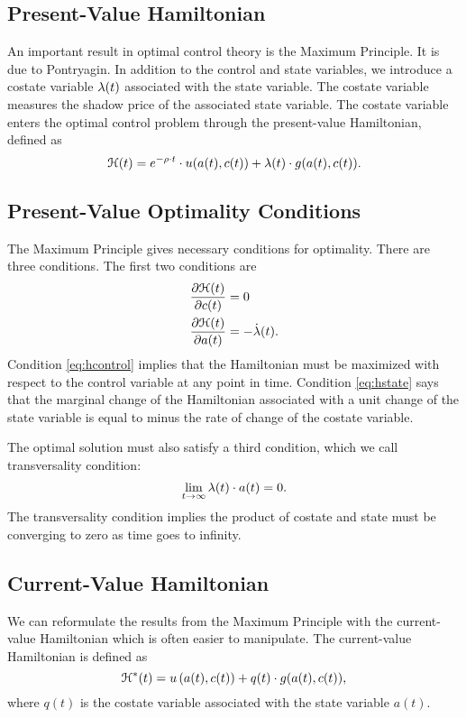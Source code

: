\documentclass[letterpaper,12pt,leqno]{article}
\begin{document}
\subsection{Present-Value Hamiltonian}

An important result in optimal control theory is the Maximum Principle. It is due to Pontryagin. In addition to the control and state variables, we introduce a costate variable $\lambda (t)$  associated with the state variable. The costate variable measures the shadow price of the associated state variable. The costate variable enters the optimal control problem through the present-value Hamiltonian, defined as 
\begin{equation}
\mathcal{H}(t)=e^{-\rho\cdot  t}\cdot  u(a(t),c(t)) +\lambda(t)\cdot g(a(t),c(t)).  
\label{eq:HAMILDEF}\end{equation}

\subsection{Present-Value Optimality Conditions}

The Maximum Principle gives necessary conditions for optimality. There are three conditions. The first two conditions are
\begin{align}
\frac{\partial \mathcal{H}(t)}{\partial c(t)} &=0  \label{eq:hcontrol} \\
\frac{\partial \mathcal{H}(t)}{\partial a(t)} &=-\dot{\lambda}(t).\label{eq:hstate}
\end{align}
Condition \eqref{eq:hcontrol} implies that the Hamiltonian must be maximized
with respect to the control variable at any point in time. Condition \eqref{eq:hstate} says that the marginal change of the Hamiltonian associated with a unit change of the state variable is equal to  minus the rate of change of the costate variable. 

The optimal solution must also satisfy a third condition, which we call transversality condition:
\begin{equation}
\lim_{t\to \infty }\lambda(t)\cdot a(t)=0.  \label{eq:tvc}
\end{equation}
The transversality condition implies the product of costate and state must be converging to zero as time goes to infinity.

\subsection{Current-Value Hamiltonian}

We can reformulate the results from the Maximum Principle with the current-value Hamiltonian which is often easier to manipulate. The current-value Hamiltonian is defined as 
\begin{equation*}
\mathcal{H}^{*}(t)=  u\left( a(t),c(t) \right) +q(t)\cdot g(a(t),c(t)),
\end{equation*}
where $q(t)$ is the costate variable associated with the state variable $a(t)$.
\end{document}
